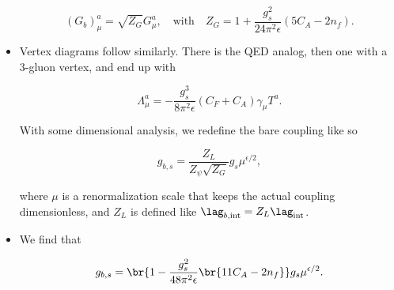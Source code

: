 \begin{itemize}
  \begin{equation}
    (G_b)^a_\mu = \sqrt{Z_G} G^a_\mu, \quad\text{with}\quad Z_G = 1 + \frac{g_s^2}{24\pi^2\epsilon}(5C_A - 2n_f).
  \end{equation}


\item Vertex diagrams follow similarly. There is the QED analog, then one with a 3-gluon vertex, and end up with

  \begin{equation}
    \Lambda^a_\mu = - \frac{g_s^3}{8\pi^2\epsilon}(C_F + C_A)\gamma_\mu T^a.
  \end{equation}

  With some dimensional analysis, we redefine the bare coupling like so

  \begin{equation}
    g_{b,s} = \frac{Z_L}{Z_\psi \sqrt{Z_G}}g_s \mu^{\epsilon/2},
  \end{equation}

  where $\mu$ is a renormalization scale that keeps the actual coupling dimensionless, and $Z_L$ is defined like $\lag_{b,\mathrm{int}} = Z_L \lag_{\mathrm{int}}$.

\item We find that

  \begin{equation}
    g_{b,s} = \br{1 - \frac{g_s^2}{48\pi^2\epsilon}\br{11C_A - 2n_f}}g_s \mu^{\epsilon/2}.
  \end{equation}
\end{itemize}

